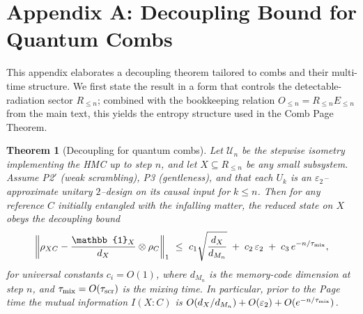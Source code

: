 \documentclass[a4paper,11pt]{article}
\newcommand{\HMC}{\textup{\textsc{HMC}}\xspace}
\newcommand{\mathbbm}[1]{\mathbb{#1}}
\theoremstyle{plain}
\newtheorem{theorem}{Theorem}
\theoremstyle{definition}
\theoremstyle{remark}
\begin{document}
\appendix

\section{Appendix A: Decoupling Bound for Quantum Combs}
\label{app:decoupling}
This appendix elaborates a decoupling theorem tailored to combs and their multi-time structure. We first state the result in a form that controls the detectable-radiation sector $R_{\le n}$; combined with the bookkeeping relation $O_{\le n}=R_{\le n}E_{\le n}$ from the main text, this yields the entropy structure used in the Comb Page Theorem.

\begin{theorem}[Decoupling for quantum combs]
\label{thm:decoupling}
\label{prop:decoupling-comb}
Let $\mathcal{U}_n$ be the stepwise isometry implementing the \HMC{} up to step $n$, and let $X\subseteq R_{\le n}$ be any small subsystem.
Assume P2$'$ (weak scrambling), P3 (gentleness), and that each $U_k$ is an $\varepsilon_2$--approximate unitary $2$--design on its causal input for $k\le n$.
Then for any reference $C$ initially entangled with the infalling matter, the reduced state on $X$ obeys the decoupling bound
\[
\left\|\rho_{XC}-\frac{\mathbbm{1}_X}{d_X}\otimes\rho_C\right\|_1 \ \le\ c_1\sqrt{\frac{d_X}{d_{M_n}}} \;+\; c_2\,\varepsilon_2 \;+\; c_3\,e^{-n/\tau_{\rm mix}},
\]
for universal constants $c_i=O(1)$, where $d_{M_n}$ is the memory-code dimension at step $n$, and $\tau_{\rm mix}=O(\tau_{\rm scr})$ is the mixing time.
In particular, prior to the Page time the mutual information $I(X{:}C)$ is $O(d_X/d_{M_n})+O(\varepsilon_2)+O(e^{-n/\tau_{\rm mix}})$.
\end{theorem}
\end{document}
